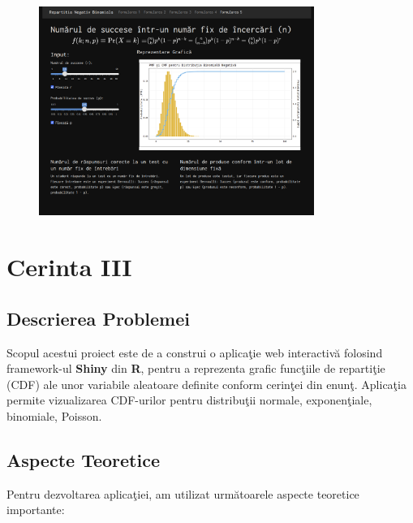 \documentclass[a4paper,11pt]{article}
\begin{document}
\begin{figure}[h!]
  \centering
  \includegraphics[width=0.8\textwidth]{./img/8.png}
  \label{fig:imaginea_ta_3}
\end{figure}











\newpage

\section*{Cerinta III}

\subsection*{Descrierea Problemei}

Scopul acestui proiect este de a construi o aplica\c{t}ie web interactiv\u{a} folosind framework-ul \textbf{Shiny} din \textbf{R}, pentru a reprezenta grafic func\c{t}iile de reparti\c{t}ie (CDF) ale unor variabile aleatoare definite conform cerin\c{t}ei din enun\c{t}. Aplica\c{t}ia permite vizualizarea CDF-urilor pentru distribu\c{t}ii normale, exponen\c{t}iale, binomiale, Poisson.

\subsection*{Aspecte Teoretice}
Pentru dezvoltarea aplica\c{t}iei, am utilizat urm\u{a}toarele aspecte teoretice importante:
\end{document}
